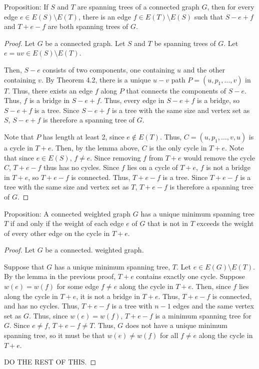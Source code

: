 \documentclass[12pt]{article}
\begin{document}
Proposition: If $S$ and $T$ are spanning trees of a connected graph $G$, then for every edge $e \in E(S) \setminus E(T)$, there is an edge $f \in E(T) \setminus E(S)$ such that $S-e+f$ and $T+e-f$ are both spanning trees of $G$.
\begin{proof}
    Let $G$ be a connected graph.
    Let $S$ and $T$ be spanning trees of $G$.
    Let $e=uv \in E(S) \setminus E(T)$.

    Then, $S - e$ consists of two components, one containing $u$ and the other containing $v$.
    By Theorem 4.2, there is a unique $u-v$ path $P = (u, p_1, \hdots, v)$ in $T$.
    Thus, there exists an edge $f$ along $P$ that connects the components of $S - e$.
    Thus, $f$ is a bridge in $S - e + f$.
    Thus, every edge in $S-e+f$ is a bridge, so $S-e+f$ is a tree.
    Since $S-e+f$ is a tree with the same size and vertex set as $S$, $S-e+f$ is therefore a spanning tree of $G$. %

    Note that $P$ has length at least 2, since $e \notin E(T)$.
    Thus, $C = (u, p_1, \hdots, v, u)$ is a cycle in $T+e$.
    Then, by the lemma above, $C$ is the only cycle in $T+e$.
    Note that since $e \in E(S)$, $f \neq e$.
    Since removing $f$ from $T+e$ would remove the cycle $C$, $T+e-f$ thus has no cycles.
    Since $f$ lies on a cycle of $T+e$, $f$ is not a bridge in $T+e$, so $T+e-f$ is connected.
    Thus, $T+e-f$ is a tree.
    Since $T+e-f$ is a tree with the same size and vertex set as $T$, $T+e-f$ is therefore a spanning tree of $G$.
\end{proof}

\newpage{} Proposition: A connected weighted graph $G$ has a unique minimum spanning tree $T$ if and only if the weight of each edge $e$ of $G$ that is not in $T$ exceeds the weight of every other edge on the cycle in $T+e$.
\begin{proof}
    Let $G$ be a connected. weighted graph.

    Suppose that $G$ has a unique minimum spanning tree, $T$.
    Let $e \in E(G) \setminus E(T)$.
    By the lemma in the previous proof, $T+e$ contains exactly one cycle.
    Suppose $w(e) = w(f)$ for some edge $f \neq e$ along the cycle in $T+e$.
    Then, since $f$ lies along the cycle in $T+e$, it is not a bridge in $T+e$. %
    Thus, $T+e-f$ is connected, and has no cycles.
    Thus, $T+e-f$ is a tree with $n-1$ edges and the same vertex set as $G$.
    Thus, since $w(e) = w(f)$, $T+e-f$ is a minimum spanning tree for $G$.
    Since $e \neq f$, $T+e-f \neq T$.
    Thus, $G$ does not have a unique minimum spanning tree, so it must be that $w(e) \neq w(f)$ for all $f \neq e$ along the cycle in $T+e$.

    DO THE REST OF THIS.
\end{proof}
\end{document}
